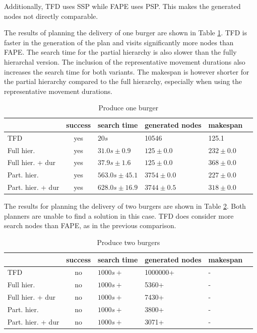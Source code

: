 Additionally, \ac{TFD} uses \ac{SSP} while \ac{FAPE} uses \ac{PSP}.
This makes the generated nodes not directly comparable.

The results of planning the delivery of one burger are shown in Table \ref{tab:eval-burger}.
TFD is faster in the generation of the plan and visits significantly more nodes than \ac{FAPE}.
The search time for the partial hierarchy is also slower than the fully hierarchal version.
The inclusion of the representative movement durations also increases the search time for both variants.
The makespan is however shorter for the partial hierarchy compared to the full hierarchy, especially when using the representative movement durations.


\begin{table}
  \centering
  \begin{tabular}{lcllll}
                   & success & search time  & generated nodes & makespan         \\
    \hline
    TFD                & yes & $20s$            &  10546          &  125.1       \\
    Full hier.            & yes & $31.0s\pm 0.9$   & $125\pm 0.0$    &  $232\pm 0.0$            \\
    Full hier. + dur      & yes & $37.9s\pm 1.6$   & $125\pm 0.0$    &  $368\pm 0.0$      \\
    Part. hier.        & yes & $563.0s\pm 45.1$ & $3754\pm 0.0$   &  $227\pm 0.0$   \\
    Part. hier. + dur & yes & $628.0s\pm 16.9$ & $3744\pm 0.5$   &  $318\pm 0.0$            \\
  \end{tabular}
  \caption{Produce one burger}
  \label{tab:eval-burger}
\end{table}

The results for planning the delivery of two burgers are shown in Table \ref{tab:eval-burgers}.
Both planners are unable to find a solution in this case.
TFD does consider more search nodes than \ac{FAPE}, as in the previous comparison.

\begin{table}
  \centering
  \begin{tabular}{lcllll}
    & success & search time  & generated nodes & makespan         \\
  \hline
  TFD             & no & $1000s+$ & 1000000+ &  -       \\
  Full hier.            & no & $1000s+$ & 5360+    &  -          \\
  Full hier. + dur      & no & $1000s+$ & 7430+    &  -    \\
  Part. hier.       & no & $1000s+$ & 3800+    &  - \\
  Part. hier. + dur & no & $1000s+$ & 3071+    &  -          \\
  \end{tabular}
  \caption{Produce two burgers}
  \label{tab:eval-burgers}
\end{table}

